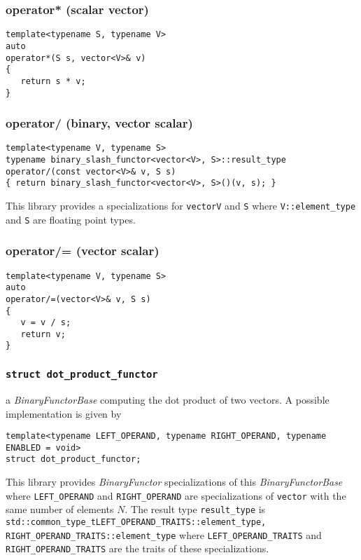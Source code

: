 \documentclass[oneside]{book}
\begin{document}
\subsubsection{operator* (scalar vector)}
\begin{verbatim}
template<typename S, typename V>
auto
operator*(S s, vector<V>& v)
{
   return s * v;
}
\end{verbatim}

\subsubsection{operator/ (binary, vector scalar)}
\begin{verbatim}
template<typename V, typename S>
typename binary_slash_functor<vector<V>, S>::result_type
operator/(const vector<V>& v, S s)
{ return binary_slash_functor<vector<V>, S>()(v, s); }
\end{verbatim}
This library provides a specializations for \texttt{vector\textlangle V\textrangle}
and \texttt{S} where    \texttt{V::element\_type} and \texttt{S} are floating point
types.

\subsubsection{operator/= (vector scalar)}
\begin{verbatim}
template<typename V, typename S>
auto
operator/=(vector<V>& v, S s)
{
   v = v / s;
   return v;
}
\end{verbatim}

\subsubsection{\texttt{struct dot\_product\_functor}}
a \textit{BinaryFunctorBase} computing the dot product of two vectors.
A possible implementation is given by
\begin{verbatim}
template<typename LEFT_OPERAND, typename RIGHT_OPERAND, typename ENABLED = void>
struct dot_product_functor;
\end{verbatim}

This library provides \textit{BinaryFunctor} specializations of this \textit{BinaryFunctorBase}
where \texttt{LEFT\_OPERAND} and \texttt{RIGHT\_OPERAND} are specializations   of \texttt{vector} with   the
same number of elements $N$. The result type \texttt{result\_type} is\newline
\texttt{std::common\_type\_t\textlangle LEFT\_OPERAND\_TRAITS::element\_type, RIGHT\_OPERAND\_TRAITS::element\_type\textrangle}\newline
 where \texttt{LEFT\_OPERAND\_TRAITS} and \texttt{RIGHT\_OPERAND\_TRAITS} are the traits of these specializations.
\end{document}

